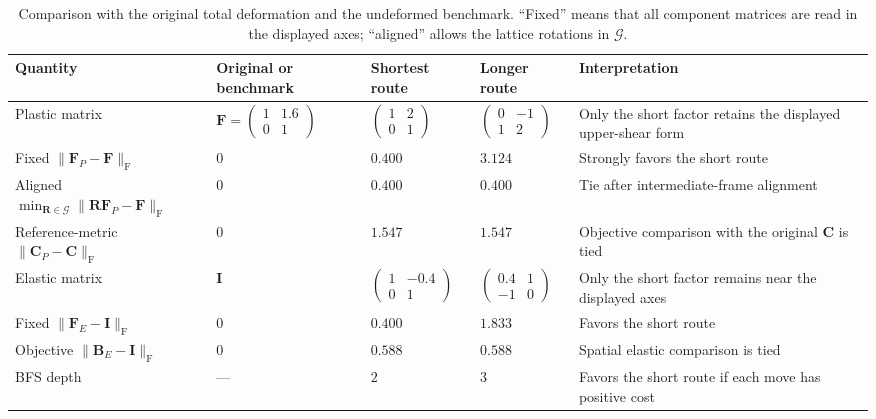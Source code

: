 \documentclass[11pt]{article}
\newcommand{\Frob}{\mathrm{F}}
\begin{document}
\begin{table}[htbp]
\centering
\caption{Comparison with the original total deformation and the undeformed
benchmark.  ``Fixed'' means that all component matrices are read in the
displayed axes; ``aligned'' allows the lattice rotations in
\(\mathcal G\).}
\label{tab:decompositions}
\footnotesize
\renewcommand{\arraystretch}{1.28}
\begin{tabularx}{\textwidth}{@{}>{\raggedright\arraybackslash}p{31mm} >{\centering\arraybackslash}p{25mm} >{\centering\arraybackslash}p{25mm} >{\centering\arraybackslash}p{25mm} X@{}}
\toprule
Quantity & Original or benchmark & \textcolor{shortblue}{Shortest route} &
\textcolor{longorange}{Longer route} & Interpretation \\
\midrule
Plastic matrix &
$\mathbf F=\left(\begin{smallmatrix}1&1.6\\0&1\end{smallmatrix}\right)$ &
$\left(\begin{smallmatrix}1&2\\0&1\end{smallmatrix}\right)$ &
$\left(\begin{smallmatrix}0&-1\\1&2\end{smallmatrix}\right)$ &
Only the short factor retains the displayed upper-shear form \\
Fixed \(\lVert\mathbf F_P-\mathbf F\rVert_{\Frob}\) & $0$ & $0.400$ & $3.124$ &
Strongly favors the short route \\
Aligned \(\min_{\mathbf R\in\mathcal G}
\lVert\mathbf R\mathbf F_P-\mathbf F\rVert_{\Frob}\) & $0$ & $0.400$ & $0.400$ &
Tie after intermediate-frame alignment \\
Reference-metric \(\lVert\mathbf C_P-\mathbf C\rVert_{\Frob}\) & $0$ & $1.547$ & $1.547$ &
Objective comparison with the original \(\mathbf C\) is tied \\
Elastic matrix & $\mathbf I$ &
$\left(\begin{smallmatrix}1&-0.4\\0&1\end{smallmatrix}\right)$ &
$\left(\begin{smallmatrix}0.4&1\\-1&0\end{smallmatrix}\right)$ &
Only the short factor remains near the displayed axes \\
Fixed \(\lVert\mathbf F_E-\mathbf I\rVert_{\Frob}\) & $0$ & $0.400$ & $1.833$ &
Favors the short route \\
Objective \(\lVert\mathbf B_E-\mathbf I\rVert_{\Frob}\) & $0$ & $0.588$ & $0.588$ &
Spatial elastic comparison is tied \\
BFS depth & --- & $2$ & $3$ & Favors the short route if each move has positive cost \\
\bottomrule
\end{tabularx}
\end{table}
\FloatBarrier
\end{document}
